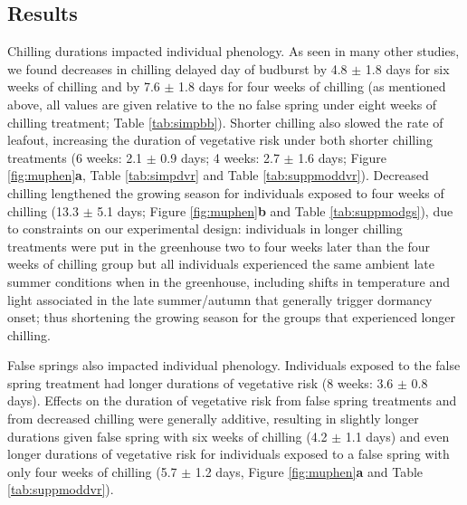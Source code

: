 \documentclass{article}\usepackage[]{graphicx}\usepackage[]{color}
\begin{document}
\begin{enumerate}
\section*{Results} 
Chilling durations impacted individual phenology. As seen in many other studies, we found decreases in chilling delayed day of budburst by 4.8 $\pm$ 1.8 days for six weeks of chilling and by 7.6 $\pm$ 1.8 days for four weeks of chilling (as mentioned above, all values are given relative to the no false spring under eight weeks of chilling treatment; Table \ref{tab:simpbb}). Shorter chilling also slowed the rate of leafout, increasing the duration of vegetative risk under both shorter chilling treatments (6 weeks: 2.1 $\pm$ 0.9 days; 4 weeks: 2.7 $\pm$ 1.6 days; Figure \ref{fig:muphen}\textbf{a}, Table \ref{tab:simpdvr} and Table \ref{tab:suppmoddvr}). Decreased chilling lengthened the growing season for individuals exposed to four weeks of chilling (13.3 $\pm$ 5.1 days; Figure \ref{fig:muphen}\textbf{b} and Table \ref{tab:suppmodgs}), due to constraints on our experimental design: individuals in longer chilling treatments were put in the greenhouse two to four weeks later than the four weeks of chilling group but all individuals experienced the same ambient late summer conditions when in the greenhouse, including shifts in temperature and light associated in the late summer/autumn that generally trigger dormancy onset; thus shortening the growing season for the groups that experienced longer chilling. 
 
False springs also impacted individual phenology. Individuals exposed to the false spring treatment had longer durations of vegetative risk (8 weeks: 3.6 $\pm$ 0.8 days). Effects on the duration of vegetative risk from false spring treatments and from decreased chilling were generally additive, resulting in slightly longer durations given false spring with six weeks of chilling (4.2 $\pm$ 1.1 days) and even longer durations of vegetative risk for individuals exposed to a false spring with only four weeks of chilling (5.7 $\pm$ 1.2 days, Figure \ref{fig:muphen}\textbf{a} and Table \ref{tab:suppmoddvr}).  


\end{enumerate}
\end{document}
